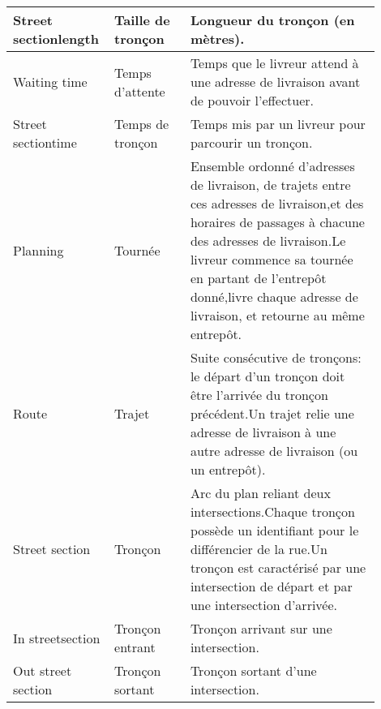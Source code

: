 \begin{longtable}{|p{0.2\linewidth}|p{0.2\linewidth}|p{0.5\linewidth}|}
Street sectionlength                        & Taille de tronçon              & Longueur du tronçon (en mètres).                                                                                                                                                                                                                                                    \\ \hline
Waiting time                                & Temps d'attente                & Temps que le livreur attend à une adresse de livraison avant de pouvoir l'effectuer.                                                                                                                                                                                                \\ \hline
Street sectiontime                          & Temps de tronçon               & Temps mis par un livreur pour parcourir un tronçon.                                                                                                                                                                                                                                 \\ \hline
Planning                                    & Tournée                        & Ensemble ordonné d'adresses de livraison, de trajets entre ces adresses de livraison,et des horaires de passages à chacune des adresses de livraison.Le livreur commence sa tournée en partant de l'entrepôt donné,livre chaque adresse de livraison, et retourne au même entrepôt. \\ \hline
Route                                       & Trajet                         & Suite consécutive de tronçons: le départ d'un tronçon doit être l'arrivée du tronçon précédent.Un trajet relie une adresse de livraison à une autre adresse de livraison (ou un entrepôt).                                                                                          \\ \hline
Street section                              & Tronçon                        & Arc du plan reliant deux intersections.Chaque tronçon possède un identifiant pour le différencier de la rue.Un tronçon est caractérisé par une intersection de départ et par une intersection d'arrivée.                                                                            \\ \hline
In streetsection                            & Tronçon entrant                & Tronçon arrivant sur une intersection.                                                                                                                                                                                                                                              \\ \hline
Out street section                          & Tronçon sortant                & Tronçon sortant d'une intersection.                                                                                                                                                                                                                                                 \\ \hline
\end{longtable}%
